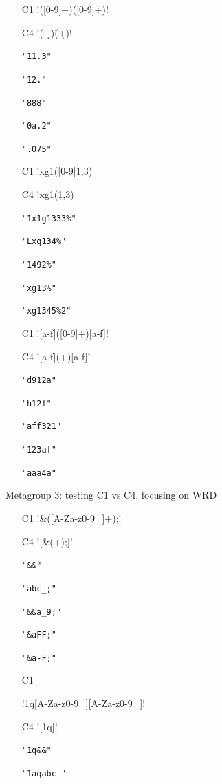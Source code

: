 \begin{footnotesize}
\begin{multicols}{3}
\begin{itemize}[noitemsep,topsep=0pt]
\item[C1] \cverb!([0-9]+)\.([0-9]+)!
\item[C4] \cverb!(\d+)\.(\d+)!
\item[] \verb|"11.3"|
\item[] \verb|"12."|
\item[] \verb|"888"|
\item[] \verb|"0a.2"|
\item[] \verb|".075"|
\item[C1] \cverb!xg1([0-9]{1,3})%
\item[C4] \cverb!xg1(\d{1,3})%
\item[] \verb|"1x1g1333%"|
\item[] \verb|"Lxg134%"|
\item[] \verb|"1492%"|
\item[] \verb|"xg13%"|
\item[] \verb|"xg1345%2"|
\item[C1] \cverb![a-f]([0-9]+)[a-f]!
\item[C4] \cverb![a-f](\d+)[a-f]!
\item[] \verb|"d912a"|
\item[] \verb|"h12f"|
\item[] \verb|"aff321"|
\item[] \verb|"123af"|
\item[] \verb|"aaa4a"|
\end{itemize}
\end{multicols}
\pagebreak
Metagroup 3: testing C1 vs C4, focusing on WRD
\vspace{-5mm}
\begin{multicols}{3}
\begin{itemize}[noitemsep,topsep=0pt]
\item[C1] \cverb!&([A-Za-z0-9_]+);!
\item[C4] \cverb![&(\w+);]!
\item[] \verb|"&&"|
\item[] \verb|"abc_;"|
\item[] \verb|"&&a_9;"|
\item[] \verb|"&aFF;"|
\item[] \verb|"&a-F;"|
\item[C1] \begin{scriptsize}\cverb!1q[A-Za-z0-9_][A-Za-z0-9_]!\end{scriptsize}
\item[C4] \cverb![1q\w\w]!
\item[] \verb|"1q&&"|
\item[] \verb|"1aqabc_"|

\end{itemize}
\end{multicols}
\end{footnotesize}
